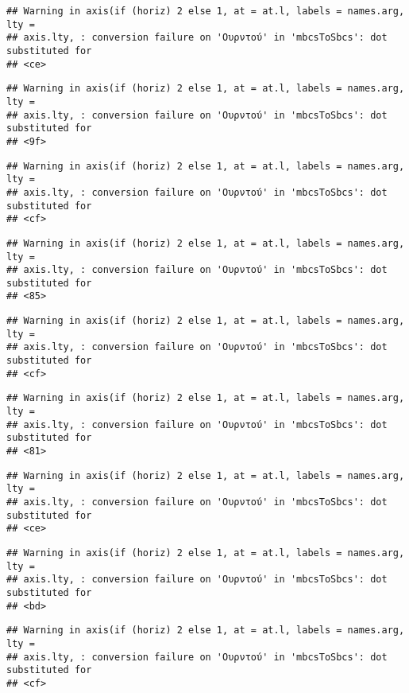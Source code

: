 \documentclass[
]{article}
\begin{document}
\begin{verbatim}
## Warning in axis(if (horiz) 2 else 1, at = at.l, labels = names.arg, lty =
## axis.lty, : conversion failure on 'Ουρντού' in 'mbcsToSbcs': dot substituted for
## <ce>
\end{verbatim}

\begin{verbatim}
## Warning in axis(if (horiz) 2 else 1, at = at.l, labels = names.arg, lty =
## axis.lty, : conversion failure on 'Ουρντού' in 'mbcsToSbcs': dot substituted for
## <9f>
\end{verbatim}

\begin{verbatim}
## Warning in axis(if (horiz) 2 else 1, at = at.l, labels = names.arg, lty =
## axis.lty, : conversion failure on 'Ουρντού' in 'mbcsToSbcs': dot substituted for
## <cf>
\end{verbatim}

\begin{verbatim}
## Warning in axis(if (horiz) 2 else 1, at = at.l, labels = names.arg, lty =
## axis.lty, : conversion failure on 'Ουρντού' in 'mbcsToSbcs': dot substituted for
## <85>
\end{verbatim}

\begin{verbatim}
## Warning in axis(if (horiz) 2 else 1, at = at.l, labels = names.arg, lty =
## axis.lty, : conversion failure on 'Ουρντού' in 'mbcsToSbcs': dot substituted for
## <cf>
\end{verbatim}

\begin{verbatim}
## Warning in axis(if (horiz) 2 else 1, at = at.l, labels = names.arg, lty =
## axis.lty, : conversion failure on 'Ουρντού' in 'mbcsToSbcs': dot substituted for
## <81>
\end{verbatim}

\begin{verbatim}
## Warning in axis(if (horiz) 2 else 1, at = at.l, labels = names.arg, lty =
## axis.lty, : conversion failure on 'Ουρντού' in 'mbcsToSbcs': dot substituted for
## <ce>
\end{verbatim}

\begin{verbatim}
## Warning in axis(if (horiz) 2 else 1, at = at.l, labels = names.arg, lty =
## axis.lty, : conversion failure on 'Ουρντού' in 'mbcsToSbcs': dot substituted for
## <bd>
\end{verbatim}

\begin{verbatim}
## Warning in axis(if (horiz) 2 else 1, at = at.l, labels = names.arg, lty =
## axis.lty, : conversion failure on 'Ουρντού' in 'mbcsToSbcs': dot substituted for
## <cf>
\end{verbatim}
\end{document}
